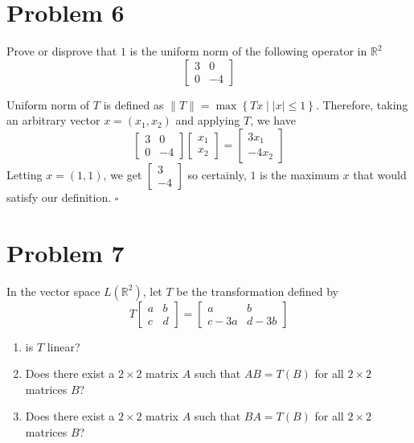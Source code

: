 \documentclass[11pt]{article}
\newcommand{\R}{\mathbb{R}}
\newcommand{\set}[1]{\left\{ #1\right\}}
\newenvironment{proof}{\noindent{\bf Proof.}}{\hfill $\square$\medskip}
\begin{document}
\section{Problem 6}
Prove or disprove that $1$ is the uniform norm of the following operator in $\R^{2}$
$$\begin{bmatrix}
        3 & 0  \\
        0 & -4
    \end{bmatrix}$$

\begin{proof}
Uniform norm of $T$ is defined as $\lVert T\rVert=\max\set{Tx\mid\lvert x\rvert\leq 1}$. Therefore, taking
an arbitrary vector $x=(x_{1},x_{2})$ and applying $T$, we have
$$\begin{bmatrix}
    3&0\\0&-4
\end{bmatrix}\begin{bmatrix}
    x_{1}\\x_{2}
\end{bmatrix}=\begin{bmatrix}
    3x_{1}\\-4x_{2}
\end{bmatrix}$$
Letting $x=(1,1)$, we get $\begin{bmatrix}
    3\\-4
\end{bmatrix}$ so certainly, $1$ is the maximum $x$ that would satisfy our definition.
\end{proof}

\section{Problem 7}
In the vector space $L(\R^{2})$, let $T$ be the transformation defined by
$$T\begin{bmatrix}
        a & b \\
        c & d
    \end{bmatrix}=\begin{bmatrix}
        a    & b    \\
        c-3a & d-3b
    \end{bmatrix}$$
\begin{enumerate}[label=(\alph*)]
    \item is $T$ linear?
    \item Does there exist a $2\times2$ matrix $A$ such that $AB=T(B)$ for all $2\times2$
          matrices $B$?
    \item Does there exist a $2\times2$ matrix $A$ such that $BA=T(B)$ for all $2\times2$
          matrices $B$?
\end{enumerate}
\end{document}

